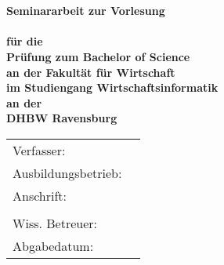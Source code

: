 \begin{titlepage}
	\begin{center}
		\vspace*{2cm}
		\LARGE\bf\myTopic\\
		\Large\rm\mySubTopic\\
		\vspace*{3cm}
		\bf Seminararbeit zur Vorlesung\\
		\myVorlesung\\
		\normalsize\rm
		\vspace*{1cm}
		für die\\
		Prüfung zum Bachelor of Science\\
		\vspace*{1cm}
		an der Fakultät für Wirtschaft\\
		im Studiengang Wirtschaftsinformatik\\
		\vspace*{1cm}
		an der\\
		DHBW Ravensburg
		\vfill
	\end{center}
	\begin{tabular}{ll}
		Verfasser:&\myAutor\\
		Ausbildungsbetrieb:&\myCompany\\
		Anschrift:&\myCompanyAddressStreet\\
		&\myCompanyAddressCity\\
		Wiss. Betreuer:&\myProf\\
		Abgabedatum:&\myEndDate\\
	\end{tabular}
\end{titlepage}
\newpage
\setcounter{page}{2}

